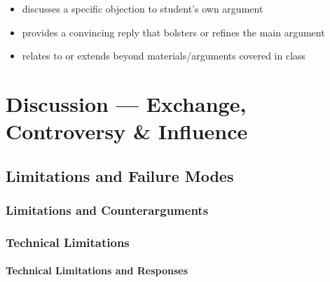 \documentclass[
  11pt,
  letterpaper,
]{book}
\begin{document}
\begin{tcolorbox}[enhanced jigsaw, colbacktitle=quarto-callout-note-color!10!white, toprule=.15mm, coltitle=black, opacityback=0, colback=white, bottomtitle=1mm, title=\textcolor{quarto-callout-note-color}{\faInfo}\hspace{0.5em}{10\% of Grade: \textasciitilde{} 14\% of text \textasciitilde{} 4200
words \textasciitilde{} 10 pages}, rightrule=.15mm, bottomrule=.15mm, breakable, arc=.35mm, toptitle=1mm, leftrule=.75mm, titlerule=0mm, left=2mm, opacitybacktitle=0.6, colframe=quarto-callout-note-color-frame]

\begin{itemize}
\item
  discusses a specific objection to student's own argument
\item
  provides a convincing reply that bolsters or refines the main argument
\item
  relates to or extends beyond materials/arguments covered in class
\end{itemize}

\end{tcolorbox}


\chapter{Discussion --- Exchange, Controversy \&
Influence}\label{sec-discussion}

\section{Limitations and Failure Modes}\label{sec-limitationsA}

\subsection{Limitations and
Counterarguments}\label{sec-limitations-counterarguments}

\subsection{Technical Limitations}\label{sec-technical-limitations}

\subsubsection{Technical Limitations and
Responses}\label{sec-technical-limitations2}
\end{document}
